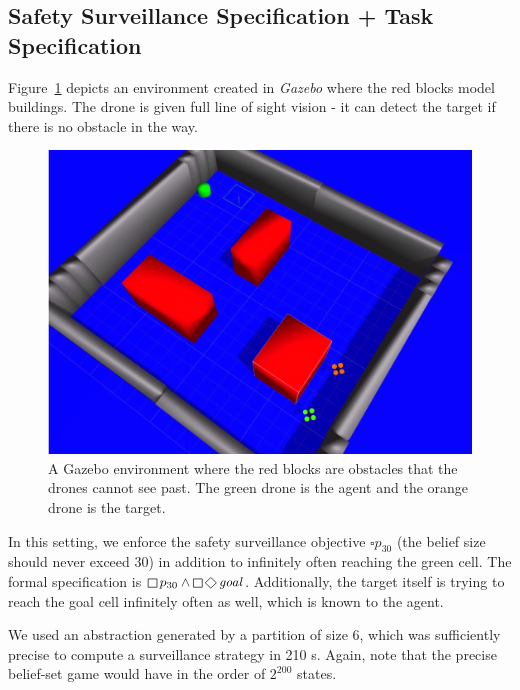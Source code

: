 \subsection{Safety Surveillance Specification + Task Specification}
Figure~\ref{fig:case2} depicts an environment created in \emph{Gazebo} where the red blocks model buildings. The drone is given full line of sight vision - it can detect the target if there is no obstacle in the way. 
\begin{figure}
\centering
\includegraphics[scale=0.13]{figs/ROS_fig.png}\caption{A Gazebo environment where the red blocks are obstacles that the drones cannot see past. The green drone is the agent and the orange drone is the target.}\label{fig:case2}
\vspace{-.5cm}
\end{figure}

In this setting, we enforce the safety surveillance objective $\square p_{30}$ (the belief size should never exceed 30) in addition to infinitely often reaching the green cell. The formal specification is $\LTLglobally p_{30} \wedge \LTLglobally\LTLfinally \mathit{goal}$. Additionally, the target itself is trying to reach the goal cell infinitely often as well, which is known to the agent.

We used an abstraction generated by a partition of size 6, which was sufficiently precise to compute a surveillance strategy in 210 s. Again, note that the precise belief-set game would have in the order of $2^{200}$ states.
 
